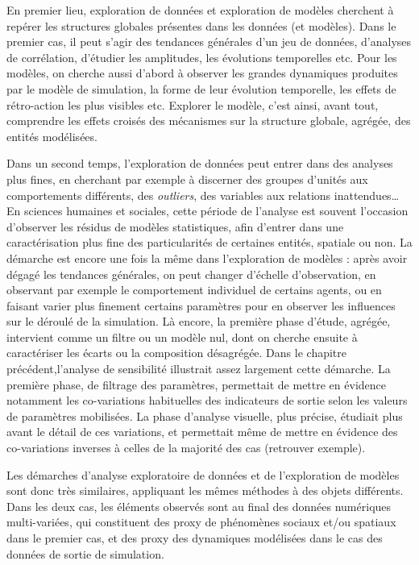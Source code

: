 \noindent En premier lieu, exploration de données et exploration de modèles cherchent à repérer les structures globales présentes dans les données (et modèles).
Dans le premier cas, il peut s'agir des tendances générales d'un jeu de données, d'analyses de corrélation, d'étudier les amplitudes, les évolutions temporelles etc.
Pour les modèles, on cherche aussi d'abord à observer les grandes dynamiques produites par le modèle de simulation, la forme de leur évolution temporelle, les effets de rétro-action les plus visibles etc.
Explorer le modèle, c'est ainsi, avant tout, comprendre les effets croisés des mécanismes sur la structure globale, agrégée, des entités modélisées.

\noindent Dans un second temps, l'exploration de données peut entrer dans des analyses plus fines, en cherchant par exemple à discerner des groupes d'unités aux comportements différents, des \textit{outliers}, des variables aux relations inattendues\ldots
En sciences humaines et sociales, cette période de l'analyse est souvent l'occasion d'observer les résidus de modèles statistiques, afin d'entrer dans une caractérisation plus fine des particularités de certaines entités, spatiale ou non.
La démarche est encore une fois la même dans l'exploration de modèles :
	après avoir dégagé les tendances générales, on peut changer d'échelle d'observation, en observant par exemple le comportement individuel de certains agents, ou en faisant varier plus finement certains paramètres pour en observer les influences sur le déroulé de la simulation.
Là encore, la première phase d'étude, agrégée, intervient comme un filtre ou un modèle nul, dont on cherche ensuite à caractériser les écarts ou la composition désagrégée.
Dans le chapitre précédent,l'analyse de sensibilité illustrait assez largement cette démarche.
La première phase, de filtrage des paramètres, permettait de mettre en évidence notamment les co-variations habituelles des indicateurs de sortie selon les valeurs de paramètres mobilisées.
La phase d'analyse visuelle, plus précise, étudiait plus avant le détail de ces variations, et permettait même de mettre en évidence des co-variations inverses à celles de la majorité des cas (retrouver exemple).

\noindent Les démarches d'analyse exploratoire de données et de l'exploration de modèles sont donc très similaires, appliquant les mêmes méthodes à des objets différents.
Dans les deux cas, les éléments observés sont au final des données numériques multi-variées, qui constituent des proxy de phénomènes sociaux et/ou spatiaux dans le premier cas, et des proxy des dynamiques modélisées dans le cas des données de sortie de simulation.

